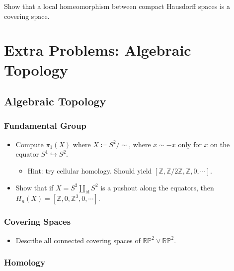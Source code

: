 Show that a local homeomorphism between compact Hausdorff spaces is a
covering space.

\hypertarget{extra-problems-algebraic-topology}{%
\section{Extra Problems: Algebraic
Topology}\label{extra-problems-algebraic-topology}}

\hypertarget{algebraic-topology}{%
\subsection{Algebraic Topology}\label{algebraic-topology}}

\hypertarget{fundamental-group}{%
\subsubsection{Fundamental Group}\label{fundamental-group}}

\begin{itemize}
\tightlist
\item
  Compute \(\pi_1(X)\) where \(X \coloneqq S^2/\sim\), where
  \(x\sim -x\) only for \(x\) on the equator
  \(S^1 \hookrightarrow S^2\).

  \begin{itemize}
  \tightlist
  \item
    Hint: try cellular homology. Should yield
    \([{\mathbb{Z}}, {\mathbb{Z}}/2{\mathbb{Z}}, {\mathbb{Z}}, 0, \cdots]\).
  \end{itemize}
\item
  Show that if \(X = S^2 {\coprod}_{\operatorname{id}} S^2\) is a
  pushout along the equators, then
  \(H_n(X) = [{\mathbb{Z}}, 0, {\mathbb{Z}}^3, 0, \cdots]\).
\end{itemize}

\hypertarget{covering-spaces-1}{%
\subsubsection{Covering Spaces}\label{covering-spaces-1}}

\begin{itemize}
\tightlist
\item
  Describe all connected covering spaces of
  \({\mathbb{RP}}^2 \vee {\mathbb{RP}}^2\).
\end{itemize}

\hypertarget{homology}{%
\subsubsection{Homology}\label{homology}}

